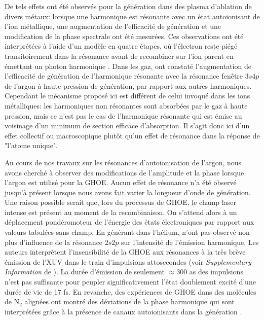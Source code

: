 De tels effets ont été observés pour la génération dans des plasma d'ablation de divers métaux: lorsque une harmonique est résonante avec un état autoionisant de l'ion métallique, une augmentation de l'efficacité de génération  et une modification de la phase spectrale  ont été mesurées. Ces observations ont été interprétées à l'aide d'un modèle en quatre étapes, où l'électron reste piégé transitoirement dans la résonance avant de recombiner sur l'ion parent en émettant un photon harmonique . Dans les gaz,  ont constaté l'augmentation de l'efficacité de génération de l'harmonique résonante avec la résonance fenêtre $3s4p$ de l'argon à haute pression de génération, par rapport aux autres harmoniques. Cependant le mécanisme proposé ici est différent de celui invoqué dans les ions métalliques: les harmoniques non résonantes sont absorbées par le gaz à haute pression, mais ce n'est pas le cas de l'harmonique résonante qui est émise au voisinage d'un minimum de section efficace d'absorption. Il s'agit donc ici d'un effet collectif ou macroscopique plutôt qu'un effet de résonance dans la réponse de "l'atome unique".

Au cours de nos travaux sur les résonances d'autoionisation de l'argon, nous avons cherché à observer des modifications de l'amplitude et la phase lorsque l'argon est utilisé pour la GHOE. Aucun effet de résonance n'a été observé jusqu'à présent lorsque nous avons fait varier la longueur d'onde de génération. Une raison possible serait que, lors du processus de GHOE, le champ laser intense est présent au moment de la recombinaison. On s'attend alors à un déplacement pondéromoteur de l'énergie des états électroniques par rapport aux valeurs tabulées sans champ. En générant dans l'hélium,  n'ont pas observé non plus d'influence de la résonance $2s2p$ sur l'intensité de l'émission harmonique. Les auteurs interprètent l'insensibilité de la GHOE aux résonances à la très brève émission de l'XUV dans le train d'impulsions attosecondes (voir \textit{Supplementary Information} de ). La durée d'émission de seulement $\approx 300$ as des impulsions n'est pas suffisante pour peupler significativement l'état doublement excité d'une durée de vie de 17 fs. En revanche, des expériences de GHOE dans des molécules de N$_2$ alignées ont montré des déviations de la phase harmonique qui sont interprétées grâce à la présence de canaux autoionisants dans la génération .

